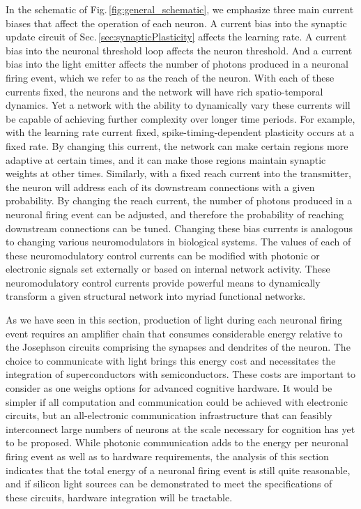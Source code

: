 \documentclass[twocolumn]{article}
\begin{document}
In the schematic of Fig.\,\ref{fig:general_schematic}, we emphasize three main current biases that affect the operation of each neuron. A current bias into the synaptic update circuit of Sec.\,\ref{sec:synapticPlasticity} affects the learning rate. A current bias into the neuronal threshold loop affects the neuron threshold. And a current bias into the light emitter affects the number of photons produced in a neuronal firing event, which we refer to as the reach of the neuron. With each of these currents fixed, the neurons and the network will have rich spatio-temporal dynamics. Yet a network with the ability to dynamically vary these currents will be capable of achieving further complexity over longer time periods. For example, with the learning rate current fixed, spike-timing-dependent plasticity occurs at a fixed rate. By changing this current, the network can make certain regions more adaptive at certain times, and it can make those regions maintain synaptic weights at other times. Similarly, with a fixed reach current into the transmitter, the neuron will address each of its downstream connections with a given probability. By changing the reach current, the number of photons produced in a neuronal firing event can be adjusted, and therefore the probability of reaching downstream connections can be tuned. Changing these bias currents is analogous to changing various neuromodulators in biological systems. The values of each of these neuromodulatory control currents can be modified with photonic or electronic signals set externally or based on internal network activity. These neuromodulatory control currents provide powerful means to dynamically transform a given structural network into myriad functional networks.

As we have seen in this section, production of light during each neuronal firing event requires an amplifier chain that consumes considerable energy relative to the Josephson circuits comprising the synapses and dendrites of the neuron. The choice to communicate with light brings this energy cost and necessitates the integration of superconductors with semiconductors. These costs are important to consider as one weighs options for advanced cognitive hardware. It would be simpler if all computation and communication could be achieved with electronic circuits, but an all-electronic communication infrastructure that can feasibly interconnect large numbers of neurons at the scale necessary for cognition has yet to be proposed. While photonic communication adds to the energy per neuronal firing event as well as to hardware requirements, the analysis of this section indicates that the total energy of a neuronal firing event is still quite reasonable, and if silicon light sources can be demonstrated to meet the specifications of these circuits, hardware integration will be tractable.
\end{document}
